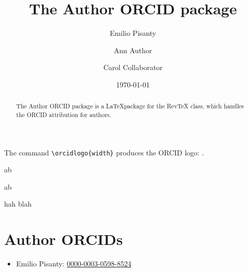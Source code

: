 \documentclass[%
  reprint,
  aps,
  pra,
  a4paper,
]{revtex4-2}
\newcommand{\orcidd}[1]{%
  \href{%
    https://orcid.org/#1%
  }{%
   \,\protect\texttt{[image: ORCID-icon.png]}\,%
  }%
}
\begin{document}
\title{The Author ORCID package}


\author{Emilio Pisanty}

\author{Ann Author}

\author{Carol Collaborator}


\date{\today}



\begin{abstract}
The Author ORCID package is a \LaTeX package for the RevTeX class, which handles the ORCID attribution for authors.
\end{abstract}

\maketitle





{\color{gray}
\lipsum[1]
}

The command \verb|\orcidlogo{width}| produces the ORCID logo: \orcidlogo{8pt}.




\setlength{\fboxsep}{0pt}

a\orcidlogo{8pt}b

a\fbox{\orcidlogo{8pt}}b

hah blah

























\section*{Author ORCIDs}
\vspace{-1mm}
\begin{itemize}[
  itemsep=-1mm,
  leftmargin=+\relax,
  label={}
  ]
\item Emilio Pisanty:
   \href{https://orcid.org/0000-0003-0598-8524}{0000-0003-0598-8524}
\end{itemize}



 

\end{document}
